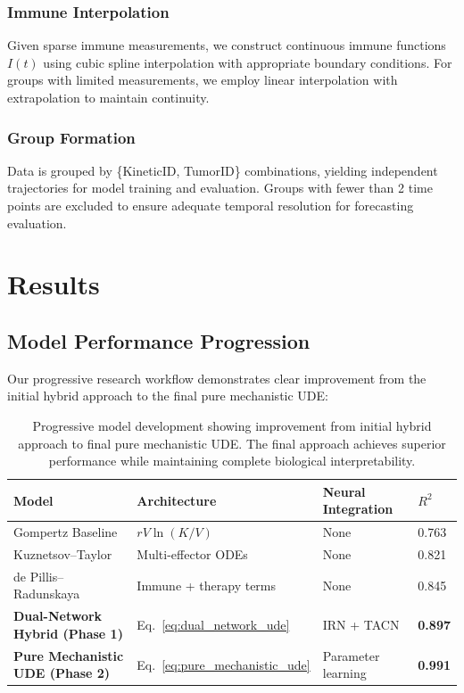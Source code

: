 \documentclass{juliacon}
\begin{document}
\subsubsection{Immune Interpolation}
Given sparse immune measurements, we construct continuous immune functions $I(t)$ using cubic spline interpolation with appropriate boundary conditions. For groups with limited measurements, we employ linear interpolation with extrapolation to maintain continuity.

\subsubsection{Group Formation}
Data is grouped by \{KineticID, TumorID\} combinations, yielding independent trajectories for model training and evaluation. Groups with fewer than 2 time points are excluded to ensure adequate temporal resolution for forecasting evaluation.

\section{Results}

\subsection{Model Performance Progression}

Our progressive research workflow demonstrates clear improvement from the initial hybrid approach to the final pure mechanistic UDE:

\begin{table}[t]\centering
\setlength{\tabcolsep}{5pt}
\small
\begin{tabular}{@{}p{3.2cm}p{3.8cm}p{2.8cm}p{1.8cm}@{}}
\toprule
\textbf{Model} & \textbf{Architecture} & \textbf{Neural Integration} & \textbf{$R^2$} \\
\midrule
Gompertz Baseline & $rV\ln(K/V)$ & None & 0.763 \\
Kuznetsov--Taylor & Multi-effector ODEs & None & 0.821 \\
de Pillis--Radunskaya & Immune + therapy terms & None & 0.845 \\
\midrule
\textbf{Dual-Network Hybrid (Phase 1)} & Eq.~\ref{eq:dual_network_ude} & IRN + TACN & \textbf{0.897} \\
\textbf{Pure Mechanistic UDE (Phase 2)} & Eq.~\ref{eq:pure_mechanistic_ude} & Parameter learning & \textbf{0.991} \\
\bottomrule
\end{tabular}
\caption{Progressive model development showing improvement from initial hybrid approach to final pure mechanistic UDE. The final approach achieves superior performance while maintaining complete biological interpretability.}
\label{tab:model_comparison}
\end{table}
\end{document}
